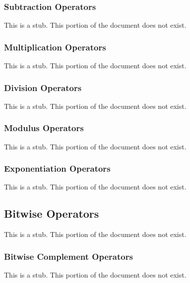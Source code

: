 \subsubsection{Subtraction Operators}
\label{Subtraction_Operators}

This is a stub.  This portion of the document does not exist.

\subsubsection{Multiplication Operators}
\label{Multiplication_Operators}

This is a stub.  This portion of the document does not exist.

\subsubsection{Division Operators}
\label{Division_Operators}

This is a stub.  This portion of the document does not exist.

\subsubsection{Modulus Operators}
\label{Modulus_Operators}

This is a stub.  This portion of the document does not exist.

\subsubsection{Exponentiation Operators}
\label{Exponentiation_Operators}

This is a stub.  This portion of the document does not exist.

\subsection{Bitwise Operators}
\label{Bitwise_Operators}

This is a stub.  This portion of the document does not exist.

\subsubsection{Bitwise Complement Operators}
\label{Bitwise_Complement_Operators}

This is a stub.  This portion of the document does not exist.

